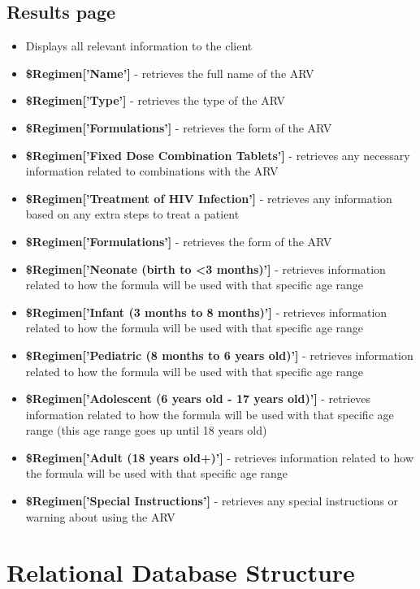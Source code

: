 \documentclass[12pt]{article}
\begin{document}
\subsection{Results page}
\begin{itemize}
\item Displays all relevant information to the client
\item \textbf{\$Regimen['Name']} - retrieves the full name of the ARV
\item \textbf{\$Regimen['Type']} - retrieves the type of the ARV
\item \textbf{\$Regimen['Formulations']} - retrieves the form of the ARV
\item \textbf{\$Regimen['Fixed Dose Combination Tablets']} - retrieves any necessary information related to combinations with the ARV
\item \textbf{\$Regimen['Treatment of HIV Infection']} - retrieves any information based on any extra steps to treat a patient
\item \textbf{\$Regimen['Formulations']} - retrieves the form of the ARV
\item \textbf{\$Regimen['Neonate (birth to <3 months)']} - retrieves information related to how the formula will be used with that specific age range
\item \textbf{\$Regimen['Infant (3 months to 8 months)']} - retrieves information related to how the formula will be used with that specific age range
\item \textbf{\$Regimen['Pediatric (8 months to 6 years old)']} - retrieves information related to how the formula will be used with that specific age range
\item \textbf{\$Regimen['Adolescent (6 years old - 17 years old)']} - retrieves information related to how the formula will be used with that specific age range (this age range goes up until 18 years old)
\item \textbf{\$Regimen['Adult (18 years old+)']} - retrieves information related to how the formula will be used with that specific age range
\item \textbf{\$Regimen['Special Instructions']} - retrieves any special instructions or warning about using the ARV

\end{itemize}

\section{Relational Database Structure}
\end{document}

